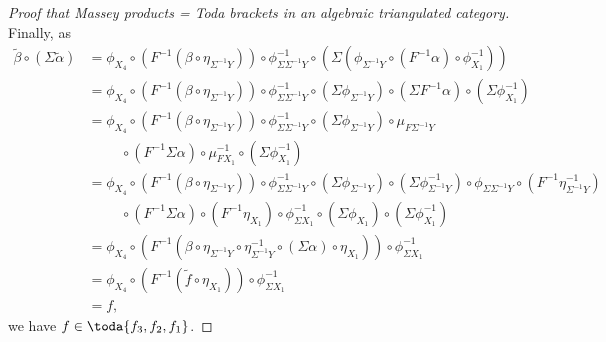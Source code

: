 \begin{proof}[Proof that Massey products = Toda brackets in an algebraic triangulated category]
    Finally, as
    \begin{align*}
        \tilde{\beta} \circ (\Sigma \tilde{\alpha}) &= \phi_{X_4} \circ (F^{-1} (\beta \circ \eta_{\Sigma^{-1} Y})) \circ \phi^{-1}_{\Sigma \Sigma^{-1} Y} \circ
        (\Sigma (\phi_{\Sigma^{-1} Y} \circ (F^{-1} \alpha) \circ \phi^{-1}_{X_1})) \\
        &= \phi_{X_4} \circ (F^{-1} (\beta \circ \eta_{\Sigma^{-1} Y})) \circ \phi^{-1}_{\Sigma \Sigma^{-1} Y} \circ
        (\Sigma \phi_{\Sigma^{-1} Y}) \circ (\Sigma F^{-1} \alpha) \circ (\Sigma \phi^{-1}_{X_1}) \\
        &= \phi_{X_4} \circ (F^{-1} (\beta \circ \eta_{\Sigma^{-1} Y})) \circ \phi^{-1}_{\Sigma \Sigma^{-1} Y} \circ
        (\Sigma \phi_{\Sigma^{-1} Y}) \circ \mu_{F \Sigma^{-1} Y} \\
        &\hspace{1cm} \circ (F^{-1} \Sigma \alpha) \circ \mu^{-1}_{F X_1} \circ (\Sigma \phi^{-1}_{X_1}) \\
        &= \phi_{X_4} \circ (F^{-1} (\beta \circ \eta_{\Sigma^{-1} Y})) \circ \phi^{-1}_{\Sigma \Sigma^{-1} Y} \circ
        (\Sigma \phi_{\Sigma^{-1} Y}) \circ (\Sigma \phi^{-1}_{\Sigma^{-1} Y}) \circ \phi_{\Sigma \Sigma^{-1} Y} \circ (F^{-1} \eta^{-1}_{\Sigma^{-1} Y}) \\
        &\hspace{1cm} \circ (F^{-1} \Sigma \alpha) \circ (F^{-1} \eta_{X_1}) \circ \phi^{-1}_{\Sigma X_1} \circ (\Sigma \phi_{X_1}) \circ (\Sigma \phi^{-1}_{X_1}) \\
        &= \phi_{X_4} \circ (F^{-1} (\beta \circ \eta_{\Sigma^{-1} Y} \circ \eta^{-1}_{\Sigma^{-1} Y} \circ (\Sigma \alpha) \circ \eta_{X_1})) \circ \phi^{-1}_{\Sigma X_1} \\
        &= \phi_{X_4} \circ (F^{-1} (\tilde{f} \circ \eta_{X_1})) \circ \phi^{-1}_{\Sigma X_1} \\
        &= f,
    \end{align*}
    we have \( f \in \toda{f_3, f_2, f_1} \).
\end{proof}
